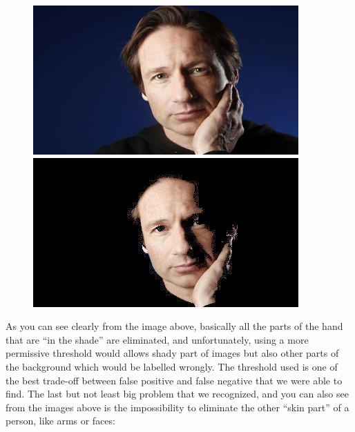 \begin{center}
    \begin{figure}[!htb]
        \begin{minipage}{0.5\textwidth}
            \centering
            \includegraphics[scale=0.7]{images/unused_seg/21.jpg}
        \end{minipage}
        \begin{minipage}{0.5\textwidth}
            \centering
            \includegraphics[scale=0.7]{images/unused_seg/21m.jpg} 
        \end{minipage}
    \end{figure}
\end{center}
As you can see clearly from the image above, basically all the parts of the hand that are “in the shade” are eliminated, and unfortunately, using a more permissive threshold would allows shady part of images but also other parts of the background which would be labelled wrongly. The threshold used is one of the best trade-off between false positive and false negative that we were able to find. 
The last but not least big problem that we recognized, and you can also see from the images above is the impossibility to eliminate the other “skin part” of a person, like arms or faces:

